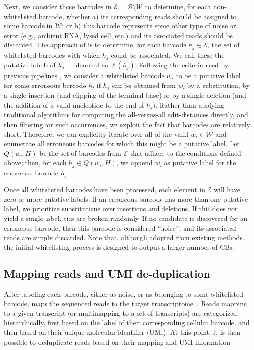 Next, we consider those barcodes in $\mathcal{E} = \mathcal{B} \setminus \mathcal{W}$ to determine, for each non-whitelisted barcode, whether a) its corresponding reads should be assigned to some barcode in $\mathcal{W}$; or b) this barcode represents some other type of noise or error (e.g., ambient RNA, lysed cell, etc.) and its associated reads should be discarded. The approach of \alevin is to determine, for each barcode $h_j \in \mathcal{E}$, the set of whitelisted barcodes with which $h_j$ could be associated. We call these the putative labels of $h_j$ --- denoted as $\ell(h_j)$. Following the criteria used by previous pipelines \citep{dropseq}, we consider a whitelisted barcode $w_i$ to be a putative label for some erroneous barcode $h_j$ if $h_j$ can be obtained from $w_i$ by a substitution, by a single insertion (and clipping of the terminal base) or by a single deletion (and the addition of a valid nucleotide to the end of $h_j$). Rather than applying traditional algorithms for computing the all-versus-all edit-distances directly, and then filtering for such occurrences, we exploit the fact that barcodes are relatively short.  Therefore, we can explicitly iterate over all of the valid $w_i \in \mathcal{W}$ and enumerate all erroneous barcodes for which this might be a putative label. Let $Q(w_i, H)$ be the set of barcodes from $\mathcal{E}$ that adhere to the conditions defined above; then, for each $h_j \in Q(w_i, H)$, we append $w_i$ as putative label for the erroneous barcode $h_j$.

Once all whitelisted barcodes have been processed, each element in $\mathcal{E}$ will have zero or more putative labels. If an erroneous barcode has more than one putative label, we prioritize substitutions over insertions and deletions. If this does not yield a single label, ties are broken randomly. If no candidate is discovered for an erroneous barcode, then this barcode is considered ``noise'', and its associated reads are simply discarded. Note that, although adopted from existing methods, the \alevin initial whitelisting process is designed to output a larger number of CBs.

\subsection{Mapping reads and UMI de-duplication}
\label{sec:mapping_reads}

After labeling each barcode, either as noise, or as belonging to some whitelisted barcode, \alevin maps the sequenced reads to the target transcriptome~\citep{rapmap,selaln}. Reads mapping to a given transcript (or multimapping to a set of transcripts) are categorized hierarchically, first based on the label of their corresponding cellular barcode, and then based on their unique molecular identifier (UMI). At this point, it is then possible to deduplicate reads based on their mapping and UMI information.

